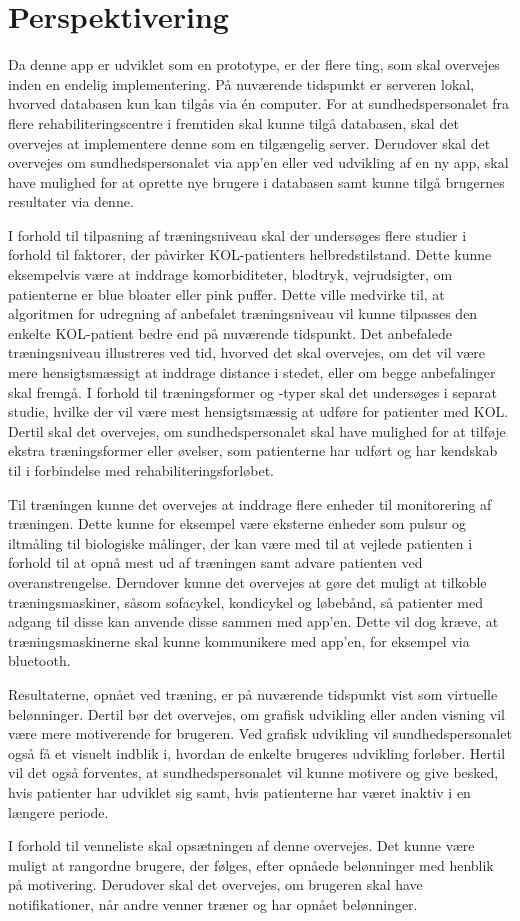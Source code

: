 \section{Perspektivering}
Da denne app er udviklet som en prototype, er der flere ting, som skal overvejes inden en endelig implementering. På nuværende tidspunkt er serveren lokal, hvorved databasen kun kan tilgås via én computer. For at sundhedspersonalet fra flere rehabiliteringscentre i fremtiden skal kunne tilgå databasen, skal det overvejes at implementere denne som en tilgængelig server. Derudover skal det overvejes om sundhedspersonalet via app’en eller ved udvikling af en ny app, skal have mulighed for at oprette nye brugere i databasen samt kunne tilgå brugernes resultater via denne.  

I forhold til tilpasning af træningsniveau skal der undersøges flere studier i forhold til faktorer, der påvirker KOL-patienters helbredstilstand. Dette kunne eksempelvis være at inddrage komorbiditeter, blodtryk, vejrudsigter, om patienterne er blue bloater eller pink puffer. Dette ville medvirke til, at algoritmen for udregning af anbefalet træningsniveau vil kunne tilpasses den enkelte KOL-patient bedre end på nuværende tidspunkt. Det anbefalede træningsniveau illustreres ved tid, hvorved det skal overvejes, om det vil være mere hensigtsmæssigt at inddrage distance i stedet, eller om begge anbefalinger skal fremgå. I forhold til træningsformer og -typer skal det undersøges i separat studie, hvilke der vil være mest hensigtsmæssig at udføre for patienter med KOL. Dertil skal det overvejes, om sundhedspersonalet skal have mulighed for at tilføje ekstra træningsformer eller øvelser, som patienterne har udført og har kendskab til i forbindelse med rehabiliteringsforløbet.

Til træningen kunne det overvejes at inddrage flere enheder til monitorering af træningen. Dette kunne for eksempel være eksterne enheder som pulsur og iltmåling til biologiske målinger, der kan være med til at vejlede patienten i forhold til at opnå mest ud af træningen samt advare patienten ved overanstrengelse. Derudover kunne det overvejes at gøre det muligt at tilkoble træningsmaskiner, såsom sofacykel, kondicykel og løbebånd, så patienter med adgang til disse kan anvende disse sammen med app’en. Dette vil dog kræve, at træningsmaskinerne skal kunne kommunikere med app’en, for eksempel via bluetooth. 

Resultaterne, opnået ved træning, er på nuværende tidspunkt vist som virtuelle belønninger. Dertil bør det overvejes, om grafisk udvikling eller anden visning vil være mere motiverende for  brugeren. Ved grafisk udvikling vil sundhedspersonalet også få et visuelt indblik i, hvordan de enkelte brugeres udvikling forløber. Hertil vil det også forventes, at sundhedspersonalet vil kunne motivere og give besked, hvis patienter har udviklet sig samt, hvis patienterne har været inaktiv i en længere periode. 

I forhold til venneliste skal opsætningen af denne overvejes. Det kunne være muligt at rangordne brugere, der følges, efter opnåede belønninger med henblik på motivering. Derudover skal det overvejes, om brugeren skal have notifikationer, når andre venner træner og har opnået belønninger. 